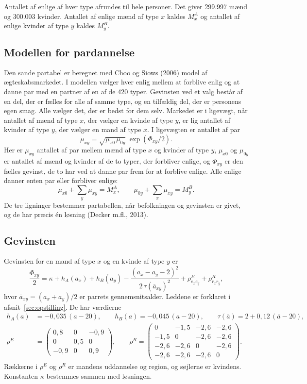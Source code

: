 \documentclass[11pt,a4paper]{article}
\begin{document}
Antallet af enlige af hver type afrundes til hele personer. Det giver 299.997 mænd og 300.003
kvinder. Antallet af enlige mænd af type $x$ kaldes $M^A_x$ og antallet af enlige kvinder af type $y$
kaldes $M^B_y$.

\subsection{Modellen for pardannelse}

Den sande partabel er beregnet med Choo og Siows (2006) model af ægteskabsmarkedet. I modellen
vælger hver enlig mellem at forblive enlig og at danne par med en partner af en af de 420 typer.
Gevinsten ved et valg består af en del, der er fælles for alle af samme type, og en tilfældig del,
der er personens egen smag. Alle vælger det, der er bedst for dem selv. Markedet er i ligevægt, når
antallet af mænd af type $x$, der vælger en kvinde af type $y$, er lig antallet af kvinder af type
$y$, der vælger en mand af type $x$. I ligevægten er antallet af par
\[
\mu_{xy}=\sqrt{\mu_{x0}\,\mu_{0y}}\;\exp(\Phi_{xy}/2) .
\]
Her er $\mu_{xy}$ antallet af par mellem mænd af type $x$ og kvinder af type $y$, $\mu_{x0}$ og
$\mu_{0y}$ er antallet af mænd og kvinder af de to typer, der forbliver enlige, og $\Phi_{xy}$ er
den fælles gevinst, de to har ved at danne par frem for at forblive enlige. Alle enlige danner enten
par eller forbliver enlige:
\[
\mu_{x0}+\sum_y\mu_{xy}=M^A_x, \qquad \mu_{0y}+\sum_x\mu_{xy}=M^B_y .
\]
De tre ligninger bestemmer partabellen, når befolkningen og gevinsten er givet, og de har præcis én
løsning (Decker m.fl., 2013).

\subsection{Gevinsten}

Gevinsten for en mand af type $x$ og en kvinde af type $y$ er
\[
\frac{\Phi_{xy}}{2}=\kappa+h_A(a_x)+h_B(a_y)-\frac{(a_x-a_y-2)^2}{2\,\tau(\bar a_{xy})^2}
+\rho^E_{e_xe_y}+\rho^R_{r_xr_y},
\]
hvor $\bar a_{xy}=(a_x+a_y)/2$ er parrets gennemsnitsalder. Leddene er forklaret i
afsnit~\ref{sec:opstilling}. De har værdierne
\begin{align*}
h_A(a) &= -0{,}035\,(a-20), \qquad h_B(a) = -0{,}045\,(a-20), \qquad \tau(\bar a) = 2+0{,}12\,(\bar a-20),\\
\rho^E &= \begin{pmatrix} 0{,}8 & 0 & -0{,}9\\ 0 & 0{,}5 & 0\\ -0{,}9 & 0 & 0{,}9 \end{pmatrix},
\qquad
\rho^R = \begin{pmatrix} 0 & -1{,}5 & -2{,}6 & -2{,}6\\ -1{,}5 & 0 & -2{,}6 & -2{,}6\\ -2{,}6 & -2{,}6 & 0 & -2{,}6\\ -2{,}6 & -2{,}6 & -2{,}6 & 0 \end{pmatrix}.
\end{align*}
Rækkerne i $\rho^E$ og $\rho^R$ er mandens uddannelse og region, og søjlerne er kvindens.
Konstanten $\kappa$ bestemmes sammen med løsningen.
\end{document}
